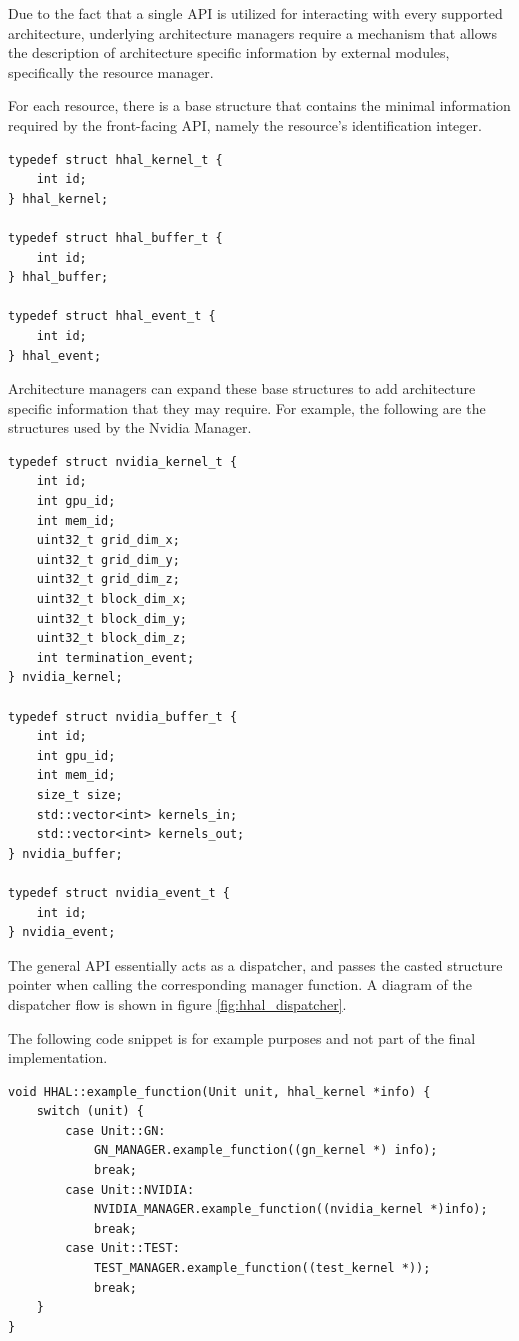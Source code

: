 Due to the fact that a single API is utilized for interacting with every supported architecture, underlying architecture managers require a mechanism that allows the description of architecture specific information by external modules, specifically the resource manager.

For each resource, there is a base structure that contains the minimal information required by the front-facing API, namely the resource's identification integer. 

\begin{lstlisting}[style=CStyle, caption=HHAL API - Base structures]
typedef struct hhal_kernel_t {
    int id;
} hhal_kernel;

typedef struct hhal_buffer_t {
    int id;
} hhal_buffer;

typedef struct hhal_event_t {
    int id;
} hhal_event;
\end{lstlisting}

Architecture managers can expand these base structures to add architecture specific information that they may require. For example, the following are the structures used by the Nvidia Manager.

\begin{lstlisting}[style=CStyle, label={HHAL:NvidiaStructs}, caption=HHAL Nvidia Manager - Extended structures]
typedef struct nvidia_kernel_t {
    int id;
    int gpu_id;
    int mem_id;
    uint32_t grid_dim_x;
    uint32_t grid_dim_y;
    uint32_t grid_dim_z;
    uint32_t block_dim_x;
    uint32_t block_dim_y;
    uint32_t block_dim_z;
    int termination_event;
} nvidia_kernel;

typedef struct nvidia_buffer_t {
    int id;
    int gpu_id;
    int mem_id;
    size_t size;
    std::vector<int> kernels_in;
    std::vector<int> kernels_out;
} nvidia_buffer;

typedef struct nvidia_event_t {
    int id;
} nvidia_event;
\end{lstlisting}

The general API essentially acts as a dispatcher, and passes the casted structure pointer when calling the corresponding manager function. A diagram of the dispatcher flow is shown in figure \ref{fig:hhal_dispatcher}.

The following code snippet is for example purposes and not part of the final implementation.

\begin{lstlisting}[style=CStyle, caption=HHAL API Example - Dispatching architecture-specific structures]
void HHAL::example_function(Unit unit, hhal_kernel *info) {
    switch (unit) {
        case Unit::GN:
            GN_MANAGER.example_function((gn_kernel *) info);
            break;
        case Unit::NVIDIA:
            NVIDIA_MANAGER.example_function((nvidia_kernel *)info);
            break;
        case Unit::TEST:
            TEST_MANAGER.example_function((test_kernel *));
            break;
    }
}
\end{lstlisting}

